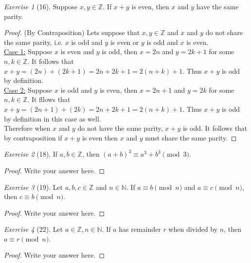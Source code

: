 \documentclass[12pt]{amsart}
\theoremstyle{remark}
\newtheorem*{exercise}{Exercise}%
\def\NN{\ensuremath{\mathbb N}}
\def\ZZ{\ensuremath{\mathbb Z}}
\theoremstyle{mycomment}
\begin{document}
\begin{exercise}[16] Suppose $x,y\in\ZZ$. If $x+y$ is even, then $x$ and $y$ have the same parity.
\begin{proof}
	(By Contraposition) Lets suppose that $x,y\in\ZZ$ and $x$ and $y$ do not share the same parity, i.e. $x$ is odd and $y$ is even or $y$ is odd and $x$ is even. \\
\underline{Case 1:} Suppose $x$ is even and $y$ is odd, then $x=2n$ and $y = 2k+1$ for some $n,k\in\ZZ$. It follows that $x + y = (2n) + (2k+1) = 2n + 2k + 1 = 2(n+k)+1$. Thus $x+y$ is odd by definition. \\
\underline{Case 2:} Suppose $x$ is odd and $y$ is even, then $x = 2n+1$ and $y = 2k$ for some $n,k\in\ZZ$. It fllows that $x + y = (2n+1) + (2k) = 2n + 2k + 1 = 2(n + k) + 1$. Thus $x + y$ is odd by definition in this case as well. \\
Therefore when $x$ and $y$ do not have the same parity, $x+y$ is odd. It follows that by contraposition if $x+y$ is even then $x$ and $y$ must share the same parity.
\end{proof}
\end{exercise}

\begin{exercise}[18] If $a,b\in\ZZ$, then $(a+b)^{3}\equiv a^{3}+b^{3}\pmod 3$. %
\begin{proof}
Write your answer here.
\end{proof}
\end{exercise}

\begin{exercise}[19] Let $a,b,c\in\ZZ$ and $n\in\NN$. If $a\equiv b\pmod n$ and $a\equiv c\pmod n$, then $c\equiv b\pmod n$.
\begin{proof}
Write your answer here.
\end{proof}
\end{exercise}

\begin{exercise}[22] Let $a\in\ZZ, n\in\NN$. If $a$ has remainder $r$ when divided by $n$, then $a\equiv r\pmod n$.
\begin{proof}
Write your answer here.
\end{proof}
\end{exercise}
\end{document}
